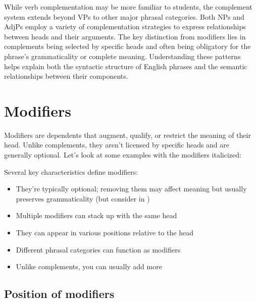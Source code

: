 While verb complementation may be more familiar to students, the complement system extends beyond VPs to other major phrasal categories. Both NPs and AdjPs employ a variety of complementation strategies to express relationships between heads and their arguments. The key distinction from modifiers lies in complements being selected by specific heads and often being obligatory for the phrase's grammaticality or complete meaning. Understanding these patterns helps explain both the syntactic structure of English phrases and the semantic relationships between their components.

\section{Modifiers} \label{sec:modifiers}

Modifiers are dependents that augment, qualify, or restrict the meaning of their head. Unlike complements, they aren't licensed by specific heads and are generally optional. Let's look at some examples with the modifiers italicized:

\ea\label{ex:modifier-types}
   \z
\z
Several key characteristics define modifiers:

\begin{itemize}[noitemsep]
   \item They're typically optional; removing them may affect meaning but usually preserves grammaticality (but consider  in )
   \item Multiple modifiers can stack up with the same head
   \item They can appear in various positions relative to the head
   \item Different phrasal categories can function as modifiers
   \item Unlike complements, you can usually add more
\end{itemize}

\subsection{Position of modifiers}

